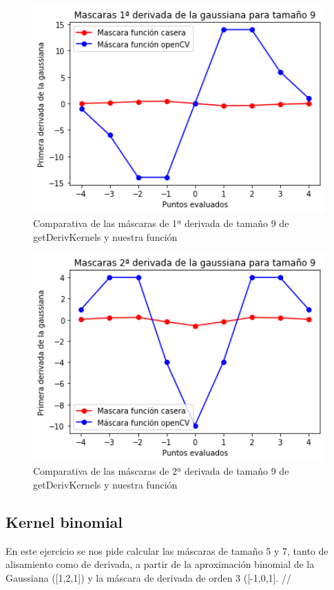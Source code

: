 \documentclass[12pt,spanish]{article}
\begin{document}
\begin{figure}[H]
	\centering
	\includegraphics[width=12cm]{./imagenes_memoria/1d_t9.png}
	\caption{Comparativa de las máscaras de 1ª derivada de tamaño 9 de getDerivKernels y nuestra función}
	\label{mask_1d_t9}
\end{figure}

\begin{figure}[H]
	\centering
	\includegraphics[width=12cm]{./imagenes_memoria/2d_t9.png}
	\caption{Comparativa de las máscaras de 2ª derivada de tamaño 9 de getDerivKernels y nuestra función}
	\label{mask_2d_t9}
\end{figure}

\subsection{Kernel binomial}
En este ejercicio se nos pide calcular las máscaras de tamaño 5 y 7, tanto de alisamiento como de derivada, a partir de la aproximación binomial de la Gaussiana ([1,2,1]) y la máscara de derivada de orden 3 ([-1,0,1]. //
\end{document}
